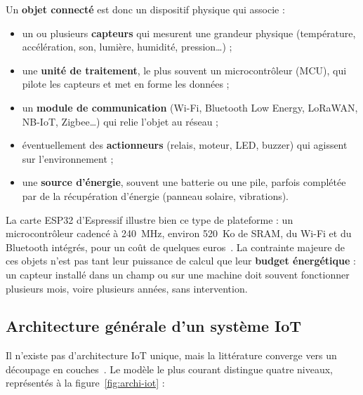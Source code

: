 Un \textbf{objet connecté} est donc un dispositif physique qui associe :
\begin{itemize}
  \item un ou plusieurs \textbf{capteurs} qui mesurent une grandeur physique
        (température, accélération, son, lumière, humidité, pression\dots) ;
  \item une \textbf{unité de traitement}, le plus souvent un microcontrôleur
        (MCU), qui pilote les capteurs et met en forme les données ;
  \item un \textbf{module de communication} (Wi-Fi, Bluetooth Low Energy,
        LoRaWAN, NB-IoT, Zigbee\dots) qui relie l'objet au réseau ;
  \item éventuellement des \textbf{actionneurs} (relais, moteur, LED,
        buzzer) qui agissent sur l'environnement ;
  \item une \textbf{source d'énergie}, souvent une batterie ou une pile, parfois
        complétée par de la récupération d'énergie (panneau solaire, vibrations).
\end{itemize}

La carte ESP32 d'Espressif illustre bien ce type de plateforme : un
microcontrôleur cadencé à 240~MHz, environ 520~Ko de SRAM, du Wi-Fi et du
Bluetooth intégrés, pour un coût de quelques euros~\cite{espressif-esp32}.
La contrainte majeure de ces objets n'est pas tant leur puissance de calcul que
leur \textbf{budget énergétique} : un capteur installé dans un champ ou sur une
machine doit souvent fonctionner plusieurs mois, voire plusieurs années, sans
intervention.

\subsection{Architecture générale d'un système IoT}

Il n'existe pas d'architecture IoT unique, mais la littérature converge vers un
découpage en couches~\cite{alfuqaha2015,atzori2010}. Le modèle le plus courant
distingue quatre niveaux, représentés à la figure~\ref{fig:archi-iot} :


